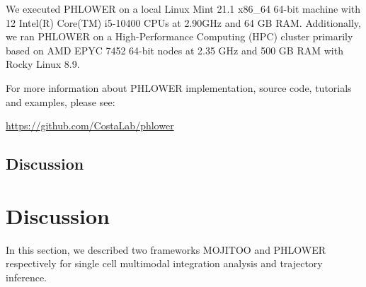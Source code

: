 We executed PHLOWER on a local Linux Mint 21.1 x86\_64 64-bit machine with 12 Intel(R) Core(TM) i5-10400 CPUs at 2.90GHz and 64 GB RAM. Additionally, we ran PHLOWER on a High-Performance Computing (HPC) cluster primarily based on AMD EPYC 7452 64-bit nodes at 2.35 GHz and 500 GB RAM with Rocky Linux 8.9.

For more information about PHLOWER implementation, source code, tutorials and examples, please see:
\begin{center}
\url{https://github.com/CostaLab/phlower}
\end{center}

\subsection{Discussion}

\section{Discussion}
In this section, we described two frameworks MOJITOO and PHLOWER respectively for single cell multimodal integration analysis and trajectory inference.
